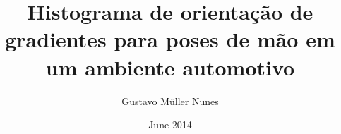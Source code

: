 \documentclass[a4paper,11pt,oneside]{book}
\begin{document}
\author{Gustavo Müller Nunes}
\title{Histograma de orientação de gradientes para poses de mão em um ambiente automotivo}
\date{June 2014}

\maketitle
\tableofcontents 	%
\listoftables 		%
\listoffigures 		%

%


%
%
\end{document}
